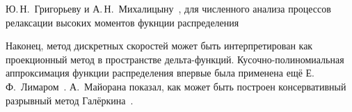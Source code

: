 
Ю.\,Н.~Григорьеву и А.\,Н.~Михалицыну~\cite{Grigoriev1983},
для численного анализа процессов релаксации высоких моментов фукнции распределения


Наконец, метод дискретных скоростей может быть интерпретирован как проекционный метод в пространстве дельта-функций.
Кусочно-полиномиальная аппроксимация функции распределения впервые была применена ещё Е.\,Ф.~Лимаром~\cite{Limar1973}.
А.~Майорана показал, как может быть построен консервативный разрывный метод Галёркина~\cite{Majorana2011}.



